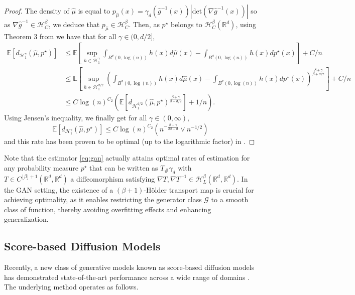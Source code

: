 \documentclass{article}
\begin{document}
\begin{proof}
 
 The density of $\hat{\mu}$ is equal to $p_{\hat{\mu}}(x)=\gamma_d (\hat{g}^{-1}(x))|\text{det}(\nabla \hat{g}^{-1}(x))|$ so as $\nabla \hat{g}^{-1}\in \mathcal{H}^{\beta}_{C}$, we deduce that $p_{\hat{\mu}} \in \mathcal{H}^{\beta}_{C} $. Then, as  $p^\star$ belongs to $\mathcal{H}^{\beta}_C(\mathbb{R}^d)$, using Theorem 3 from \cite{stephanovitch2024ipm} we have that for all $\gamma \in (0,d/2]$,
 \begin{align*}
\mathbb{E}[d_{\mathcal{H}^{\gamma}_1}(\hat{\mu},p^\star)]& \leq \mathbb{E}[\sup_{h \in \mathcal{H}^{\gamma}_1}\int_{B^d(0,\log(n))} h(x) d\hat{\mu}(x)- \int_{B^d(0,\log(n))} h(x) dp^\star(x)]+C/n\\
& \leq \mathbb{E}[\sup_{h \in \mathcal{H}^{d/2}_1}\left(\int_{B^d(0,\log(n))} h(x) d\hat{\mu}(x)- \int_{B^d(0,\log(n))} h(x) dp^\star(x)\right)^{\frac{\beta+\gamma}{\beta+d/2}}]+C/n\\
& \leq C\log(n)^{C_2}\left(\mathbb{E}[d_{\mathcal{H}^{d/2}_1}(\hat{\mu},p^\star)^{\frac{\beta+\gamma}{\beta+d/2}}]+1/n\right).
\end{align*}
 Using Jensen's inequality, we finally get for all $\gamma \in (0,\infty),$
  $$\mathbb{E}[d_{\mathcal{H}^{\gamma}_1}(\hat{\mu},p^\star)] \leq C\log(n)^{C_2}(n^{-\frac{\beta+\gamma}{2\beta+d}}\vee n^{-1/2})$$
  and this rate has been proven to be optimal (up to the logarithmic factor) in \cite{belomestny2019sobolev}.
\end{proof}

Note that the estimator \eqref{eq:gan} actually attains optimal rates of estimation for any probability measure $p^\star$ that can be written as $T_{\# }\gamma_d$ with $T\in C^{\lfloor \beta \rfloor+1}(\mathbb{R}^d,\mathbb{R}^d)$ a diffeomorphism  satisfying $\nabla T,\nabla T^{-1}\in  \mathcal{H}^{\beta}_L   (\mathbb{R}^d,\mathbb{R}^d)$. In the GAN setting, the existence of a $(\beta+1)$-Hölder transport map is crucial for achieving optimality, as it enables restricting the generator class $\mathcal{G}$ to a smooth class of function, thereby avoiding overfitting effects and enhancing generalization.

\subsection{Score-based Diffusion Models}
Recently, a new class of generative models known as score-based diffusion models has demonstrated state-of-the-art performance across a wide range of domains \citep{song2020score,ho2020denoising,de2022convergence}. The underlying method operates as follows.
\end{document}
